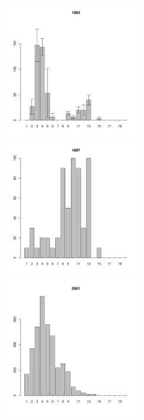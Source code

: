 \begin{figure}[h]
\begin{multicols}{3}
\hfill
\includegraphics[width=60mm]{../White_Sea/Luvenga_Goreliy/middle_1993_.pdf}
\hfill
\includegraphics[width=60mm]{../White_Sea/Luvenga_Goreliy/middle_1997_.pdf}
\hfill
\includegraphics[width=60mm]{../White_Sea/Luvenga_Goreliy/middle_2001_.pdf}
\end{multicols}



\end{figure}
